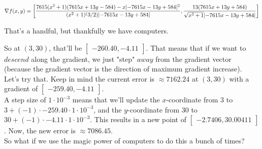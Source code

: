 \documentclass[a4paper]{article}
\begin{document}
\begin{center}
    $
    \nabla f(x, y) = 
    \begin{bmatrix}
        \dfrac
        {7615(x^2 + 1)(7615x + 13y - 584) - x\lvert-7615x - 13y + 584\rvert^2}
        {(x^2 + 1)^(3/2) \lvert-7615x - 13y + 584\rvert},
        \dfrac
        {13(7615x + 13y + 584)}
        {\sqrt{x^2 + 1}\lvert-7615x - 13y + 584\rvert}
    \end{bmatrix}
    $
\end{center}


That's a handful, but thankfully we have computers.

So at $(3, 30)$, that'll be $\begin{bmatrix}-260.40, -4.11\end{bmatrix}$. That means that if we want to $descend$ along the gradient, we just "step" $away$ from the gradient vector (because the gradient vector is the direction of maximum gradient increase).\\

Let's try that. Keep in mind the current error is $\approx 7162.24$ at $(3, 30)$ with a gradient of $\begin{bmatrix}-259.40, -4.11\end{bmatrix}$.\\
A step size of $1\cdot10^{-3}$ means that we'll update the $x$-coordinate from $3$ to $3 + (-1) \cdot -259.40 \cdot 1\cdot10^{-3}$, and the $y$-coordinate from $30$ to $30 + (-1) \cdot -4.11 \cdot 1\cdot10^{-3}$. This results in a new point of $\begin{bmatrix}-2.7406, 30.00411\end{bmatrix}$. Now, the new error is $\approx7086.45$.\\


So what if we use the magic power of computers to do this a bunch of times?

\end{document}
